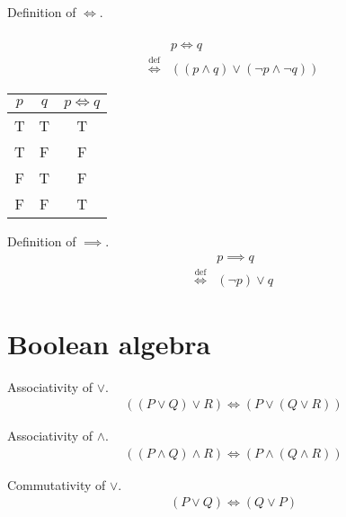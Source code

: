 \begin{defn}
Definition of $\iff$. \\ \\
\begin{align*}
& p \iff q \\
\overset{\operatorname{def}}{\iff} & ((p \land q) \lor (\lnot p \land \lnot q))
\end{align*}
\begin{tabular}{|c|c|c|}
\hline
$p$ & $q$ & $p \iff q$ \\
\hline
T & T & T \\
\hline
T & F & F \\
\hline
F & T & F \\
\hline
F & F & T \\
\hline
\end{tabular}
\end{defn}

\begin{defn}
\label{Definition:implies}
Definition of $\implies$.
\begin{align*}
& p \implies q \\
\overset{\operatorname{def}}{\iff} & (\lnot p) \lor q
\end{align*}
\end{defn}

\section{Boolean algebra}
\begin{prop}
\label{Proposition:lor_associativity}
Associativity of $\lor$.
\begin{align*}
((P \lor Q) \lor R) \iff (P \lor (Q \lor R))
\end{align*}
\end{prop}

\begin{prop}
\label{Proposition:land_associativity}
Associativity of $\land$.
\begin{align*}
((P \land Q) \land R) \iff (P \land (Q \land R))
\end{align*}
\end{prop}

\begin{prop}
\label{Proposition:lor_commutativity}
Commutativity of $\lor$.
\begin{align*}
(P \lor Q) \iff (Q \lor P)
\end{align*}
\end{prop}


